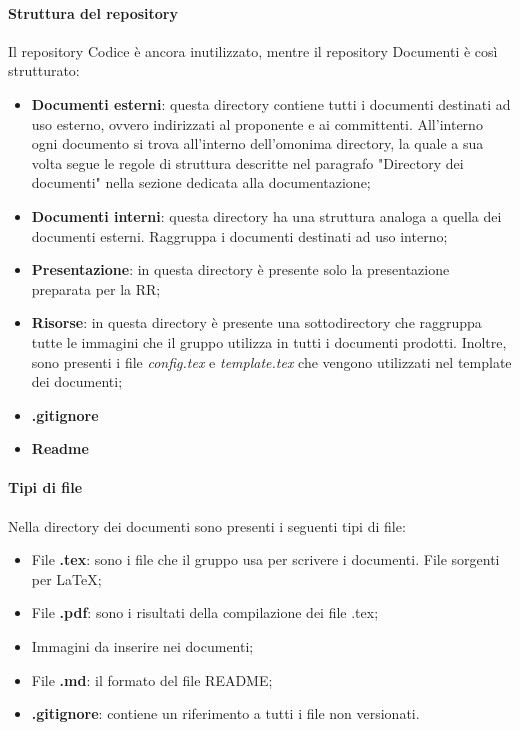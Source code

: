 \documentclass[../norme_di_progetto.tex]{subfiles}
\begin{document}
\paragraph{Struttura del repository}
Il repository Codice è ancora inutilizzato, mentre il repository Documenti è così strutturato:
\begin{itemize}
    \item \textbf{Documenti esterni}: questa directory contiene tutti i documenti destinati ad uso esterno, ovvero indirizzati al proponente e ai committenti. All'interno ogni documento si trova all'interno dell'omonima directory, la quale a sua volta segue le regole di struttura descritte nel paragrafo "Directory dei documenti" nella sezione dedicata alla documentazione;
    \item \textbf{Documenti interni}: questa directory ha una struttura analoga a quella dei documenti esterni. Raggruppa i documenti destinati ad uso interno;
    \item \textbf{Presentazione}: in questa directory è presente solo la presentazione preparata per la RR;
    \item \textbf{Risorse}: in questa directory è presente una sottodirectory che raggruppa tutte le immagini che il gruppo utilizza in tutti i documenti prodotti. Inoltre, sono presenti i file \emph{config.tex} e \emph{template.tex} che vengono utilizzati nel template dei documenti;
    \item \textbf{.gitignore}
    \item \textbf{Readme}
\end{itemize}

\paragraph{Tipi di file}
Nella directory dei documenti sono presenti i seguenti tipi di file:
\begin{itemize}
    \item File \textbf{.tex}: sono i file che il gruppo usa per scrivere i documenti. File sorgenti per \LaTeX;
    \item File \textbf{.pdf}: sono i risultati della compilazione dei file .tex;
    \item Immagini da inserire nei documenti;
    \item File \textbf{.md}: il formato del file README;
    \item \textbf{.gitignore}: contiene un riferimento a tutti i file non versionati.
\end{itemize}
\end{document}
